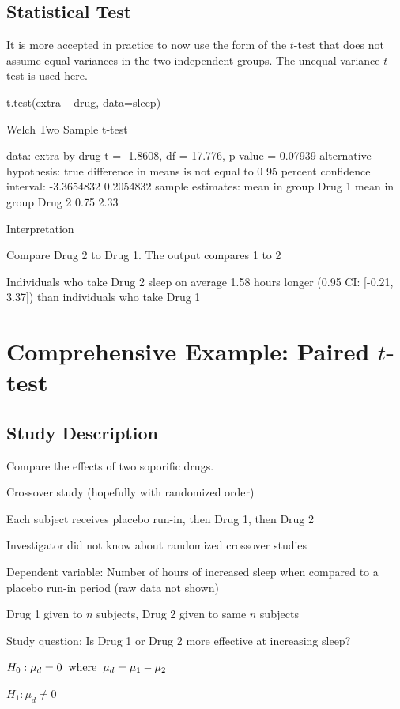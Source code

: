 \subsection{Statistical Test}
It is more accepted in practice to now use the form of the $t$-test
that does not assume equal variances in the two independent groups.
The unequal-variance $t$-test is used here.
\begin{Schunk}
\begin{Sinput}
t.test(extra ~ drug, data=sleep)
\end{Sinput}
\begin{Soutput}

	Welch Two Sample t-test

data:  extra by drug
t = -1.8608, df = 17.776, p-value = 0.07939
alternative hypothesis: true difference in means is not equal to 0
95 percent confidence interval:
 -3.3654832  0.2054832
sample estimates:
mean in group Drug 1 mean in group Drug 2 
                0.75                 2.33 
\end{Soutput}
\end{Schunk}
\bi
\item Interpretation
 \bi
 \item Compare Drug 2 to Drug 1.  The output compares 1 to 2
 \item Individuals who take Drug 2 sleep on average 1.58 hours longer (0.95 CI: [-0.21, 3.37]) than individuals who take Drug 1
 \ei
\ei

\clearpage
\section{Comprehensive Example: Paired $t$-test}

\subsection{Study Description}

\bi
\item Compare the effects of two soporific drugs.
\item Crossover study (hopefully with randomized order)
\item Each subject receives placebo run-in, then Drug 1, then Drug 2
\item Investigator did not know about randomized crossover studies
\item Dependent variable: Number of hours of increased sleep when
  compared to a placebo run-in period (raw data not shown)
\item Drug 1 given to $n$ subjects, Drug 2 given to same $n$ subjects
\item Study question: Is Drug 1 or Drug 2 more effective at increasing sleep?
  \bi
  \item $H_0: \mu_d = 0 \hspace{.2cm} \textrm{where} \hspace{.2cm} \mu_d = \mu_1 - \mu_2$
  \item $H_1: \mu_d \neq 0$
  \ei
\ei


